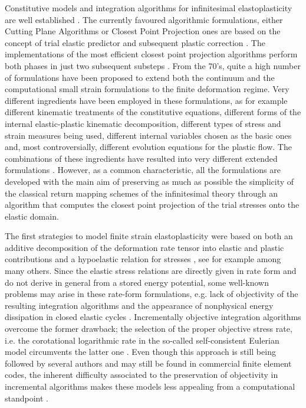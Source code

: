 \documentclass[preprint,review,12pt,sort&compress]{elsarticle}%
\begin{document}
Constitutive models and integration algorithms for infinitesimal
elastoplasticity are well established
\cite{Simo98,KojicBatheBook,LublinerBook}. The currently favoured algorithmic
formulations, either Cutting Plane Algorithms or Closest Point Projection ones
are based on the concept of trial elastic predictor and subsequent plastic
correction \cite{SimoHughesBook}. The implementations of the most efficient
closest point projection algorithms perform both phases in just two subsequent
substeps \cite{MinCamMon}. From the 70's, quite a high number of formulations
have been proposed to extend both the continuum and the computational small
strain formulations to the finite deformation regime. Very different
ingredients have been employed in these formulations, as for example different
kinematic treatments of the constitutive equations, different forms of the
internal elastic-plastic kinematic decomposition, different types of stress
and strain measures being used, different internal variables chosen as the
basic ones and, most controversially, different evolution equations for the
plastic flow. The combinations of these ingredients have resulted into very
different extended formulations \cite{ShutovIhlemann14}. However, as a common
characteristic, all the formulations are developed with the main aim of
preserving as much as possible the simplicity of the classical return mapping
schemes of the infinitesimal theory
\cite{Wilkins64,MaenchenSacks64,KriegKey76} through an algorithm that computes
the closest point projection of the trial stresses onto the elastic domain.

The first strategies to model finite strain elastoplasticity were based on
both an additive decomposition of the deformation rate tensor into elastic and
plastic contributions and a hypoelastic relation for stresses
\cite{TruesdellNollBook}, see for example
\cite{HibbittEtAl70,McMeekingRice75,KeyKrieg82,TaylorBecker83} among many
others. Since the elastic stress relations are directly given in rate form and
do not derive in general from a stored energy potential, some well-known
problems may arise in these rate-form formulations, e.g. lack of objectivity
of the resulting integration algorithms and the appearance of nonphysical
energy dissipation in closed elastic cycles \cite{SimoPister84,KojicBathe87}.
Incrementally objective integration algorithms
\cite{HughesWinget80,PinskyOrtizPister83} overcome the former drawback; the
selection of the proper objective stress rate, i.e. the corotational
logarithmic rate in the so-called self-consistent Eulerian model
\cite{XiaoBruhnsMeyers97,BruhnsXiaoMeyers99,XiaoBruhnsMeyers00} circumvents
the latter one \cite{BrepolsVladimirovReese14}. Even though this approach is
still being followed by several authors \cite{Teeriaho13,XiaoEtAl16,ZhuEtAl16}
and may still be found in commercial finite element codes, the inherent
difficulty associated to the preservation of objectivity in incremental
algorithms makes these models less appealing from a computational standpoint
\cite{RubinsteinAtluri83,BrepolsVladimirovReese14}.
\end{document}
